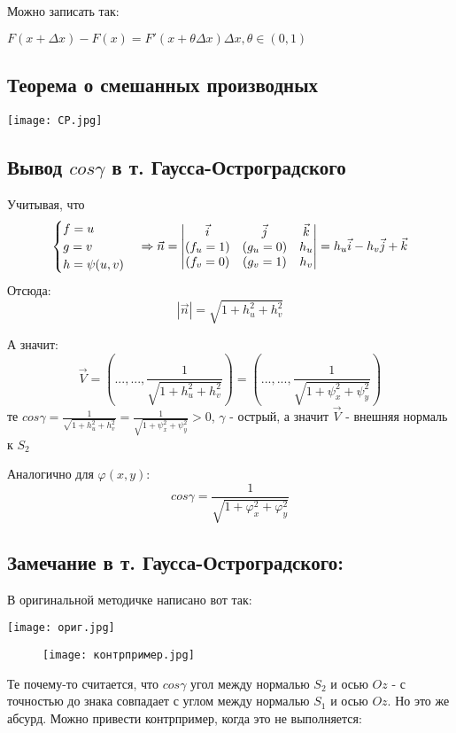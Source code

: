 \documentclass[12pt, english]{article}
\begin{document}
	Можно записать так:
	
	$F(x + \Delta x) - F(x) = F'(x + \theta\Delta x)\Delta x , \theta \in (0,1) $

\subsection{Теорема о смешанных производных}\label{eq6}
\texttt{[image: CP.jpg]}	

\subsection{Вывод $cos\gamma$ в т. Гаусса-Остроградского}\label{eq10}
Учитывая, что 
$$
\begin{cases}
   f = u \\
   g = v \\
   h = \psi(u,v)
\end{cases}
\Rightarrow
\vec{n} = 
\begin{vmatrix}
\vec{i} & \vec{j} & \vec{k} \\
(f_u = 1) & (g_u = 0) & h_u \\
(f_v = 0) & (g_v = 1) & h_v 
\end{vmatrix}
=
\-h_u \vec{i} - h_v \vec{j} + \vec{k}
$$
Отсюда:
$$
|\vec{n}| = \sqrt{1+h_u^2 + h_v^2}
$$

А значит:
$$
\vec{V} = ( ..., ... , \frac{1}{\sqrt{1+h_u^2 + h_v^2}})
=
( ..., ... , \frac{1}{\sqrt{1+\psi_x^2 + \psi_y^2}})
$$
те $cos\gamma = \frac{1}{\sqrt{1+h_u^2 + h_v^2}} = \frac{1}{\sqrt{1+\psi_x^2 + \psi_y^2}}> 0$, $\gamma$ - острый, а значит $\vec{V}$ - внешняя нормаль к $S_2$

Аналогично для $\varphi(x,y)$:
$$cos\gamma = \frac{1}{\sqrt{1 + \varphi_x^2 + \varphi_y^2 }} $$

\subsection{Замечание в т. Гаусса-Остроградского:}\label{eq11}
	В оригинальной методичке написано вот так:
	
	\texttt{[image: ориг.jpg]}	
		\begin{wrapfigure}{r}{6cm}
	\texttt{[image: контрпример.jpg]}
	\end{wrapfigure}
	
	Те почему-то считается, что $cos\gamma$ угол между нормалью $S_2$ и осью $Oz$ - с точностью до знака совпадает с углом между нормалью $S_1$ и осью $Oz$. Но это же абсурд. Можно привести контрпример, когда это не выполняется:
	
\end{document}
